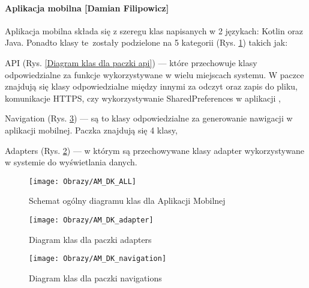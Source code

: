 \paragraph*{Aplikacja mobilna [Damian Filipowicz]}
Aplikacja mobilna składa się z szeregu klas napisanych w 2 językach: Kotlin oraz Java. Ponadto klasy te~zostały podzielone na 5 kategorii (Rys. \ref{Schemat ogólny diagramu klas dla Aplikacji mobilnej}) takich jak:

\begin{itemize*}
	\item API 
	(Rys. \ref{Diagram klas dla paczki api}) 
	---  które przechowuje klasy odpowiedzialne za funkcje wykorzystywane w wielu miejscach systemu. W paczce znajdują się klasy odpowiedzialne między innymi za odczyt oraz zapis do pliku, komunikacje HTTPS, czy wykorzystywanie SharedPreferences w aplikacji ,
	\item Navigation 
	(Rys. \ref{Diagram klas dla paczki navigations}) 
	--- są to klasy odpowiedzialne za generowanie nawigacji w aplikacji mobilnej. Paczka znajdują się 4 klasy,
	\item Adapters
	(Rys. \ref{Diagram klas dla paczki adapters}) 
	--- w którym są przechowywane klasy adapter wykorzystywane w systemie do wyświetlania danych.
\end{itemize*}

\begin{figure}[ht!]
	\centering
	\vspace{-0.6cm}
	\texttt{[image: Obrazy/AM\_DK\_ALL]}
	\caption{Schemat ogólny diagramu klas dla Aplikacji Mobilnej}
	\label{Schemat ogólny diagramu klas dla Aplikacji mobilnej}
\end{figure}
\newpage
\begin{figure}[ht!]
	\centering
	\texttt{[image: Obrazy/AM\_DK\_adapter]}
	\caption{Diagram klas dla paczki adapters}
	\label{Diagram klas dla paczki adapters}
\end{figure}
\newpage
\begin{figure}[ht!]
	\centering
	\texttt{[image: Obrazy/AM\_DK\_navigation]}
	\caption{Diagram klas dla paczki navigations}
	\label{Diagram klas dla paczki navigations}
\end{figure}

